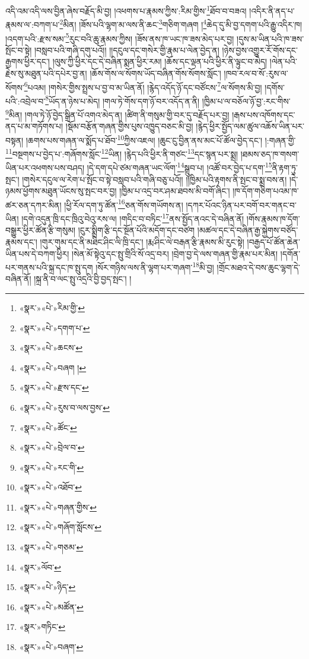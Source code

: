 འདི་འམ་འདི་ལས་བྱིན་ཞེས་བརྗོད་མི་བྱ། །འཕགས་པ་རྣམས་ཀྱིས་:རིམ་གྱིས་\footnote{«སྣར་»«པེ་»རིམ་གྱི་}ཐོབ་བ་བཟའ། །འདིར་ནི་ནད་པ་རྣམས་ལ་:བཀག་པ་\footnote{«སྣར་»«པེ་»དགག་པ་}མིན། །ཟོས་པའི་ལྷག་མ་ལས་ནི་ཆང་\footnote{«སྣར་»«པེ་»ཆངས་}གཅིག་གཞག །\footnote{«སྣར་»«པེ་»བཞག །}ཆེད་དུ་མི་བྱ་དགག་པའི་རྒྱུ་འདིར་ཁ། །འདག་པའི་:རྫས་སམ་\footnote{«སྣར་»«པེ་»རྫས་དང་}རུང་བའི་ཆུ་རྣམས་ཀྱིས། །ཟོས་ནས་ཁ་ཡང་ཁ་ཟས་མེད་པར་བྱ། །དུས་མ་ཡིན་པའི་ཁ་ཟས་སྤོང་བ་སྟེ། །བསླབ་པའི་གཞི་དགུ་པའོ།། །།དངུལ་དང་གསེར་གྱི་རྣམ་པ་ལེན་བྱེད་ན། །ཉེས་བྱས་འགྱུར་རོ་གོས་དང་རྒྱགས་ཕྱིར་དང་། །ལུས་ཀྱི་ཕྱིར་དང་དེ་བཞིན་སྨན་ཕྱིར་རམ། །ཆོས་དང་ལྡན་པའི་ཕྱིར་ནི་ལྟུང་བ་མེད། །ལེན་པའི་རྗེས་སུ་མཐུན་པའི་དཔེར་བྱ་ན། །ཆོས་གོས་ལ་སོགས་ཡོད་བཞིན་གོས་སོགས་སློང་། །ཁབ་རལ་བ་སོ་:རུས་ལ་སོགས་\footnote{«སྣར་»«པེ་»རུས་བ་ལས་བྱས་}པའམ། །གསེར་གྱིས་སྤྲས་པ་བྱ་བ་མ་ཡིན་ནོ། །རྙེད་འདོད་ཉོ་དང་བཙོངས་\footnote{«སྣར་»«པེ་»ཚོང་}ལ་སོགས་མི་བྱ། །དགོས་པའི་:འབྲེལ་བ་\footnote{«སྣར་»«པེ་»བྲེལ་བ་}ཡོད་ན་ཉེས་པ་མེད། །གལ་ཏེ་གོས་དག་ཉོ་བར་འདོད་ན་ནི། །ཁྱིམ་པ་ལ་བཅོལ་ཉོ་བྱ་:རང་གིས་\footnote{«སྣར་»«པེ་»རང་གི་}མིན། །གལ་ཏེ་ཉོ་བྱེད་སྒྲིན་པོ་འགའ་མེད་ན། །ཚིག་ནི་གསུམ་གྱི་བར་དུ་བརྗོད་པར་བྱ། །རྒས་པས་འཁོགས་དང་ནད་པ་མ་གཏོགས་པ། །སྡོམ་བརྩོན་གཞན་གྱིས་པུས་འཁྱུད་བཅང་མི་བྱ། །རྙེད་ཕྱིར་སྤྱོད་ལམ་ཚུལ་འཆོས་ཡིན་པར་བསྟན། །ཆགས་པས་གཞན་ལ་སྨོད་པ་ཐོབ་\footnote{«སྣར་»«པེ་»འཐོབ་}ཀྱིས་འཇལ། །ཆུང་ངུ་བྱིན་ནས་མང་པོ་ཚོལ་བྱེད་དང་། །:གཞན་གྱི་\footnote{«སྣར་»«པེ་»གཞན་གྱིས་}བསྔགས་པ་བྱེད་པ་:གཞོགས་སློང་\footnote{«སྣར་»«པེ་»གཞོག་སློངས་}ཡིན། །རྙེད་པའི་ཕྱིར་ནི་གཙང་\footnote{«སྣར་»«པེ་»གཅམ་}དང་སྙན་པར་སྨྲ། །ཐམས་ཅད་ཁ་གསག་ཡིན་པར་འཕགས་པས་བཤད། །དེ་དག་དཔེ་ཙམ་གཞན་ཡང་ལོག་\footnote{«སྣར་»ལོབ་}སྒྲུབ་པ། །འཚོ་བར་བྱེད་པ་དག་\footnote{«སྣར་»«པེ་»ཉིད་}ནི་རྟག་ཏུ་སྤང་། །གསེར་དངུལ་ལ་རེག་པ་སྤོང་བ་སྟེ་བསླབ་པའི་གཞི་བཅུ་པའོ།། །།ཁྱིམ་པའི་རྟགས་ནི་སྤང་བ་སྨྲ་བས་ན། །དེ་ཉམས་ཕྱོགས་མཐུན་ཡོངས་སུ་སྤང་བར་བྱ། །ཁྱིམ་པ་འདྲ་བར་ཤམ་ཐབས་མི་བགོ་ཞིང་། །ཁ་དོག་གཅིག་པའམ་ཁ་ཚར་ཅན་དཀར་མིན། །ཕྱི་རོལ་དག་ཏུ་ཚོན་\footnote{«སྣར་»«པེ་»མཚོན་}ཅན་གོས་གཡོགས་ན། །དཀར་པོའང་ཉིན་པར་བགོ་བར་གནང་བ་ཡིན། །དགེ་འདུན་ཁྲི་དང་ཁྲིའུ་བེའུ་རས་ལ། །གདིང་བ་བཏིང་\footnote{«སྣར་»གཏིང་}ནས་སྤྱོད་ནའང་དེ་བཞིན་ནོ། །གོས་རྣམས་ཁ་དོག་བསྒྱུར་ཕྱིར་ཚོན་རྩི་གསུམ། །ངུར་སྨྲིག་རྩི་དང་སྔོན་པོའི་མདོག་དང་བཙག །མཚལ་དང་དེ་བཞིན་རྒྱ་སྐྱེགས་བཙོད་རྣམས་དང་། །གུར་གུམ་དང་ནི་མཐིང་ཤིང་ལི་ཁྲི་དང་། །རྨ་ཤིང་ལེ་བརྒན་རྩི་རྣམས་མི་རུང་སྟེ། །བརྒྱད་པོ་ཚོན་ཆེན་ཡིན་པས་དེ་བཀག་ཕྱིར། །སེན་མོ་སྟེའུ་དང་སྤུ་གྲིའི་སོ་འདྲ་བར། །བྲེག་བྱ་དེ་ལས་གཞན་གྱི་རྣམ་པར་མིན། །དགོན་པར་གནས་པའི་སྐྲ་དང་ཁ་སྤུ་དག །སོར་གཉིས་ལས་ནི་ལྷག་པར་གཞག་\footnote{«སྣར་»«པེ་»བཞག་}མི་བྱ། །གྲོང་མཐའ་དེ་བས་ཆུང་ལྷག་དེ་བཞིན་ནོ། །སྐྲ་ནི་བ་ལང་སྤུ་འདྲའི་བྱི་བྱད་སྤང་། །
